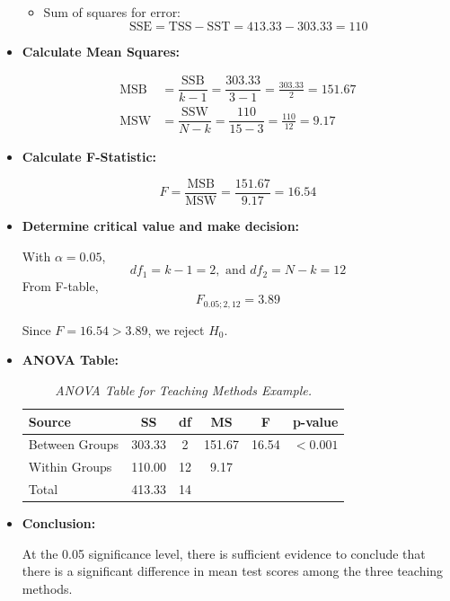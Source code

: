 \documentclass[twoside]{book}
\begin{document}
\begin{itemize}
\begin{itemize}
\item Sum of squares for error:
\begin{equation*}
\text{SSE} = \text{TSS} - \text{SST} = 413.33 - 303.33 = 110
\end{equation*}

\end{itemize}

\item \textbf{Calculate Mean Squares:}

\begin{align*}
\text{MSB} &= \dfrac{\text{SSB}}{k-1} = \dfrac{303.33}{3-1} = \frac{303.33}{2} = 151.67 \\
\text{MSW} &= \dfrac{\text{SSW}}{N-k} = \dfrac{110}{15-3} = \frac{110}{12} = 9.17
\end{align*}

\item \textbf{Calculate F-Statistic:}

\begin{equation*}
F = \frac{\text{MSB}}{\text{MSW}} = \frac{151.67}{9.17} = 16.54
\end{equation*}

\item \textbf{Determine critical value and make decision:}

With $\alpha = 0.05$, $$df_1 = k-1=2, \text{ and } df_2 = N-k=12$$
From F-table,
$$F_{0.05; 2, 12} = 3.89$$

Since $F = 16.54 > 3.89$, we reject $H_0$.

\item \textbf{ANOVA Table:}

\begin{table}[H]
\centering
\begin{tabular}{l|c|c|c|c|c}
\toprule
\textbf{Source} & \textbf{SS} & \textbf{df} & \textbf{MS} & \textbf{F} & \textbf{p-value} \\
\midrule
Between Groups & 303.33 & 2 & 151.67 & 16.54 & $< 0.001$ \\
\midrule
Within Groups & 110.00 & 12 & 9.17 & & \\
\midrule
Total & 413.33 & 14 & & & \\
\bottomrule
\end{tabular}
\caption{\textit{ANOVA Table for Teaching Methods Example.}}
\end{table}


\item \textbf{Conclusion:}

At the 0.05 significance level, there is sufficient evidence to conclude that there is a significant difference in mean test scores among the three teaching methods.
\end{itemize}
\end{document}
